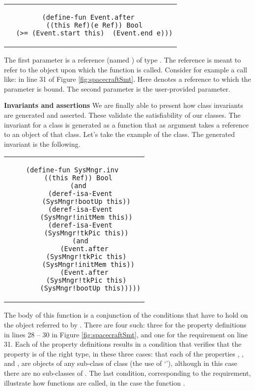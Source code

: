 \begin{center}
\begin{tabular}{c}
\small
\begin{lstlisting}
(define-fun Event.after 
  ((this Ref)(e Ref)) Bool
  (>= (Event.start this)  (Event.end e)))
\end{lstlisting}
\end{tabular}
\end{center}

\noindent The first parameter is a reference (named ) of
type . The  reference is meant to refer to the
object upon which the function is called. Consider for example a call
like:  in line 31 of Figure
\ref{fig:spacecraftSmt}. Here  denotes a reference
to which the parameter  is bound.  The second parameter is
the user-provided parameter.


\textbf{Invariants and assertions} We are finally able to present how
class invariants are generated and asserted. These validate the
satisfiability of our classes.  The invariant for a class is generated
as a function that as argument takes a  reference to an
object of that class. Let's take the example of the
 class. The generated invariant is the following.

\begin{center}
\begin{tabular}{c}
\small
\begin{lstlisting}
(define-fun SysMngr.inv 
  ((this Ref)) Bool
  (and
    (deref-isa-Event 
      (SysMngr!bootUp this))
    (deref-isa-Event 
      (SysMngr!initMem this))
    (deref-isa-Event 
      (SysMngr!tkPic this))
    (and 
      (Event.after 
        (SysMngr!tkPic this)  
        (SysMngr!initMem this)) 
      (Event.after 
        (SysMngr!tkPic this)  
        (SysMngr!bootUp this)))))
\end{lstlisting}
\end{tabular}
\end{center}

\noindent The body of this function is a conjunction of the conditions
that have to hold on the  object referred to by
. There are four such: three for the property definitions
in lines 28 -- 30 in Figure \ref{fig:spacecraftSmt}, and one for the
requirement on line 31. Each of the property definitions results in a
condition that verifies that the property is of the right type, in
these three cases: that each of the properties ,
, and , are objects of any sub-class of
class  (the use of `'), although in this case
there are no sub-classes of . The last condition,
corresponding to the requirement, illustrate how functions are called,
in the case the function .


